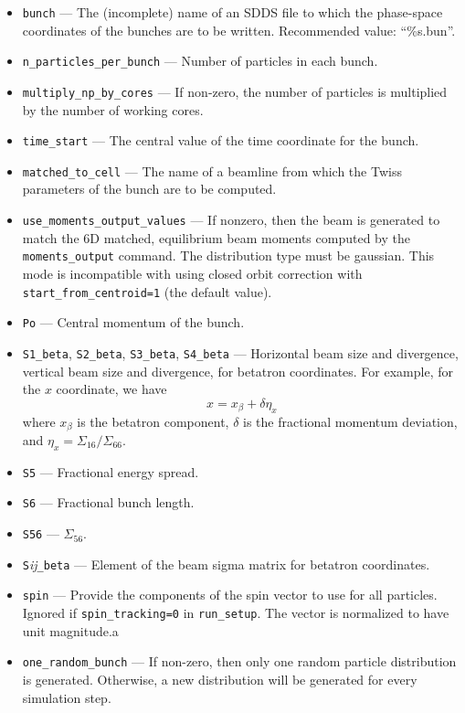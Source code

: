 \documentclass[11pt]{article}
\begin{document}
\begin{itemize}
\item \verb|bunch| --- The (incomplete) name of an SDDS file to which the phase-space coordinates
of the bunches are to be written.  Recommended value: ``\%s.bun''.  
\item \verb|n_particles_per_bunch| --- Number of particles in each bunch.
\item \verb|multiply_np_by_cores| --- If non-zero, the number of particles is multiplied by the number of
  working cores.
\item \verb|time_start| --- The central value of the time coordinate for the bunch.
\item \verb|matched_to_cell| --- The name of a beamline from which the Twiss parameters of the bunch
are to be computed.
\item \verb|use_moments_output_values| --- If nonzero, then the beam is generated to match the
  6D matched, equilibrium beam moments computed by the \verb|moments_output| command.
  The distribution type must be gaussian.
  This mode is incompatible with using closed orbit correction with \verb|start_from_centroid=1|
  (the default value).
\item \verb|Po| --- Central momentum of the bunch.

\item \verb|S1_beta|, \verb|S2_beta|, \verb|S3_beta|, \verb|S4_beta| --- Horizontal beam size and divergence, vertical
  beam size and divergence, for betatron coordinates. For example, for the $x$ coordinate, we have
\begin{equation}
x = x_\beta + \delta \eta_x
\end{equation}
where $x_\beta$ is the betatron component, $\delta$ is the fractional momentum deviation, and $\eta_x = \Sigma_{16}/\Sigma_{66}$.
\item \verb|S5| --- Fractional energy spread.
\item \verb|S6| --- Fractional bunch length.
\item \verb|S56| --- $\Sigma_{56}$.
\item \verb|S|{\em i}{\em j}\verb|_beta| --- Element of the beam sigma matrix for betatron coordinates.

\item \verb|spin| --- Provide the components of the spin vector to use for all particles. Ignored if
  \verb|spin_tracking=0| in \verb|run_setup|. The vector is normalized to have unit magnitude.a

\item \verb|one_random_bunch| --- If non-zero, then only one random
particle distribution is generated.  Otherwise, a new distribution
will be generated for every simulation step.


\end{itemize}
\end{document}
